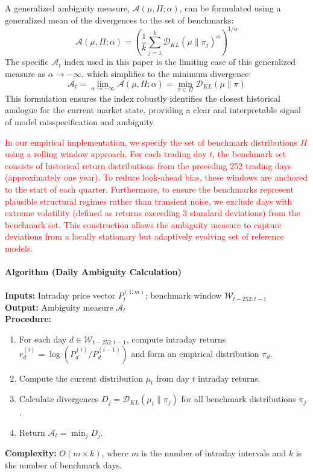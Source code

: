 \documentclass[preprint,12pt,authoryear]{elsarticle}
\begin{document}
A generalized ambiguity measure, $\mathcal{A}(\mu, \Pi; \alpha)$, can be formulated using a generalized mean of the divergences to the set of benchmarks:
\begin{equation}
    \mathcal{A}(\mu, \Pi; \alpha) = \left( \frac{1}{k} \sum_{j=1}^{k} \mathcal{D}_{KL}(\mu \| \pi_j)^{\alpha} \right)^{1/\alpha}
\end{equation}
The specific $\mathcal{A}_t$ index used in this paper is the limiting case of this generalized measure as $\alpha \to -\infty$, which simplifies to the minimum divergence:
\begin{equation}
    \mathcal{A}_t = \lim_{\alpha \to -\infty} \mathcal{A}(\mu, \Pi; \alpha) = \min_{\pi \in \Pi} \mathcal{D}_{KL}(\mu \| \pi)
\end{equation}
This formulation ensures the index robustly identifies the closest historical analogue for the current market state, providing a clear and interpretable signal of model misspecification and ambiguity.

\textcolor{red}{In our empirical implementation, we specify the set of benchmark distributions $\Pi$ using a rolling window approach. For each trading day $t$, the benchmark set consists of historical return distributions from the preceding 252 trading days (approximately one year). To reduce look-ahead bias, these windows are anchored to the start of each quarter. Furthermore, to ensure the benchmarks represent plausible structural regimes rather than transient noise, we exclude days with extreme volatility (defined as returns exceeding 3 standard deviations) from the benchmark set. This construction allows the ambiguity measure to capture deviations from a locally stationary but adaptively evolving set of reference models.}

{\color{red}
\paragraph{\textbf{Algorithm (Daily Ambiguity Calculation)}}

\textbf{Inputs:} Intraday price vector $P_{t}^{(1:m)}$; benchmark window $\mathcal{W}_{t-252:t-1}$\\

\textbf{Output:} Ambiguity measure $\mathcal{A}_t$\\

\textbf{Procedure:}
\begin{enumerate}
    \item For each day $d \in \mathcal{W}_{t-252:t-1}$, compute intraday returns $r^{(i)}_d = \log(P^{(i)}_d/P^{(i-1)}_d)$ and form an empirical distribution $\pi_d$.
    \item Compute the current distribution $\mu_t$ from day $t$ intraday returns.
    \item Calculate divergences $D_j = \mathcal{D}_{KL}(\mu_t \| \pi_j)$ for all benchmark distributions $\pi_j$.
    \item Return $\mathcal{A}_t = \min_j D_j$.
\end{enumerate}
\textbf{Complexity:} $O(m \times k)$, where $m$ is the number of intraday intervals and $k$ is the number of benchmark days.
}
\end{document}
